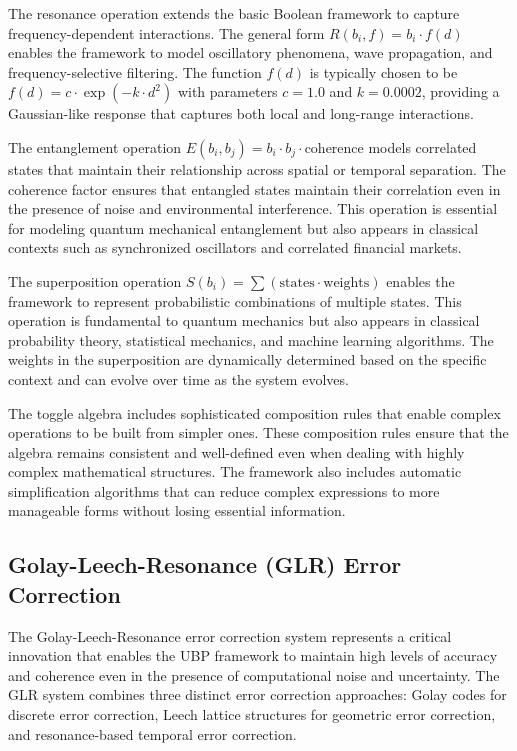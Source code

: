 \documentclass[11pt]{amsart}
\begin{document}
The resonance operation extends the basic Boolean framework to capture frequency-dependent interactions. The general form $R(b_i, f) = b_i \cdot f(d)$ enables the framework to model oscillatory phenomena, wave propagation, and frequency-selective filtering. The function $f(d)$ is typically chosen to be $f(d) = c \cdot \exp(-k \cdot d^2)$ with parameters $c = 1.0$ and $k = 0.0002$, providing a Gaussian-like response that captures both local and long-range interactions.

The entanglement operation $E(b_i, b_j) = b_i \cdot b_j \cdot \text{coherence}$ models correlated states that maintain their relationship across spatial or temporal separation. The coherence factor ensures that entangled states maintain their correlation even in the presence of noise and environmental interference. This operation is essential for modeling quantum mechanical entanglement but also appears in classical contexts such as synchronized oscillators and correlated financial markets.

The superposition operation $S(b_i) = \sum(\text{states} \cdot \text{weights})$ enables the framework to represent probabilistic combinations of multiple states. This operation is fundamental to quantum mechanics but also appears in classical probability theory, statistical mechanics, and machine learning algorithms. The weights in the superposition are dynamically determined based on the specific context and can evolve over time as the system evolves.

The toggle algebra includes sophisticated composition rules that enable complex operations to be built from simpler ones. These composition rules ensure that the algebra remains consistent and well-defined even when dealing with highly complex mathematical structures. The framework also includes automatic simplification algorithms that can reduce complex expressions to more manageable forms without losing essential information.

\subsection{Golay-Leech-Resonance (GLR) Error Correction}

The Golay-Leech-Resonance error correction system represents a critical innovation that enables the UBP framework to maintain high levels of accuracy and coherence even in the presence of computational noise and uncertainty. The GLR system combines three distinct error correction approaches: Golay codes for discrete error correction, Leech lattice structures for geometric error correction, and resonance-based temporal error correction.
\end{document}
